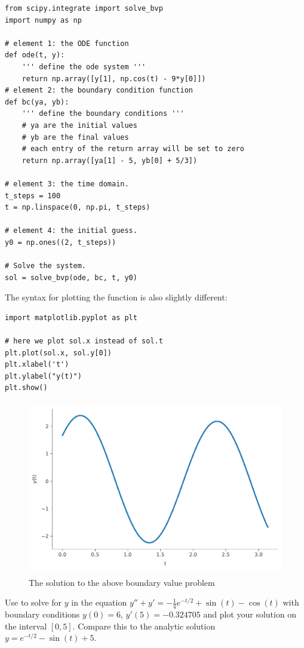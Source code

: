 \begin{lstlisting}
from scipy.integrate import solve_bvp
import numpy as np

# element 1: the ODE function
def ode(t, y):
    ''' define the ode system '''
    return np.array([y[1], np.cos(t) - 9*y[0]])
# element 2: the boundary condition function
def bc(ya, yb):
    ''' define the boundary conditions '''
    # ya are the initial values
    # yb are the final values
    # each entry of the return array will be set to zero
    return np.array([ya[1] - 5, yb[0] + 5/3])

# element 3: the time domain.
t_steps = 100
t = np.linspace(0, np.pi, t_steps)

# element 4: the initial guess.
y0 = np.ones((2, t_steps))

# Solve the system.
sol = solve_bvp(ode, bc, t, y0)
\end{lstlisting}
%
The syntax for plotting the function is also slightly different:
\begin{lstlisting}
import matplotlib.pyplot as plt

# here we plot sol.x instead of sol.t
plt.plot(sol.x, sol.y[0])
plt.xlabel('t')
plt.ylabel("y(t)")
plt.show()
\end{lstlisting}

\begin{figure}[H]
    \centering
    \includegraphics[height=3in]{figures/fig3.pdf}
    \caption{The solution to the above boundary value problem}
\end{figure}

\begin{problem}
    \label{prob:bvpintro:bvp2}
    Use  to solve for $y$ in the equation $y'' + y' = -\frac{1}{4}e^{-t/2}+\sin(t)-\cos(t)$ with boundary conditions $y(0)= 6$, $y'(5) = -0.324705$ and plot your solution on the interval $[0,5]$. Compare this to the analytic solution $y=e^{-t/2}-\sin(t)+5$.
\end{problem}

